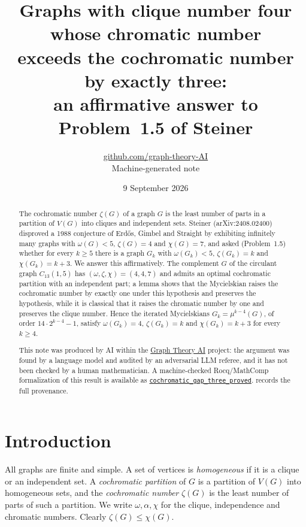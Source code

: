 \documentclass[11pt,a4paper]{article}
\title{Graphs with clique number four whose chromatic number\\ exceeds the cochromatic number by exactly three:\\ an affirmative answer to Problem~1.5 of Steiner}
\author{\href{https://github.com/graph-theory-AI}{github.com/graph-theory-AI}\\[2pt] \normalsize Machine-generated note}
\date{9 September 2026}
\theoremstyle{plain}
\theoremstyle{definition}
\theoremstyle{remark}
\newcommand{\myc}{\mu}
\begin{document}
\maketitle


\begin{abstract}
The cochromatic number $\zeta(G)$ of a graph $G$ is the least number of parts in a partition of $V(G)$ into cliques and independent sets. Steiner (arXiv:2408.02400) disproved a 1988 conjecture of Erdős, Gimbel and Straight by exhibiting infinitely many graphs with $\omega(G)<5$, $\zeta(G)=4$ and $\chi(G)=7$, and asked (Problem~1.5) whether for every $k\ge5$ there is a graph $G_k$ with $\omega(G_k)<5$, $\zeta(G_k)=k$ and $\chi(G_k)=k+3$. We answer this affirmatively. The complement $G$ of the circulant graph $C_{13}(1,5)$ has $(\omega,\zeta,\chi)=(4,4,7)$ and admits an optimal cochromatic partition with an independent part; a lemma shows that the Mycielskian raises the cochromatic number by exactly one under this hypothesis and preserves the hypothesis, while it is classical that it raises the chromatic number by one and preserves the clique number. Hence the iterated Mycielskians $G_k=\myc^{k-4}(G)$, of order $14\cdot2^{k-4}-1$, satisfy $\omega(G_k)=4$, $\zeta(G_k)=k$ and $\chi(G_k)=k+3$ for every $k\ge4$.

\medskip\noindent\small
This note was produced by AI within the \href{https://github.com/graph-theory-AI/Graph-Theory-LLM-Proofs}{Graph Theory AI} project:
the argument was found by a language model and audited by an adversarial LLM
referee, and it has not been checked by a human mathematician.
A machine-checked Rocq/MathComp formalization of this result is available as
\href{https://github.com/LLM4Rocq/graph-theory-rocq/blob/main/chromatic-theory/theories/applications/cochromatic_gap/cochromatic_gap.v}{\texttt{cochromatic\_gap\_three\_proved}}.
 records the full provenance.

\end{abstract}

\section{Introduction}

All graphs are finite and simple. A set of vertices is \emph{homogeneous} if it is a clique or an independent set. A \emph{cochromatic partition} of $G$ is a partition of $V(G)$ into homogeneous sets, and the \emph{cochromatic number} $\zeta(G)$ is the least number of parts of such a partition. We write $\omega,\alpha,\chi$ for the clique, independence and chromatic numbers. Clearly $\zeta(G)\le\chi(G)$.
\end{document}
